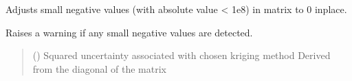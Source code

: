 \documentclass[letterpaper,10pt,english]{sphinxmanual}
\begin{document}

\begin{fulllineitems}
\label{\detokenize{misc:glomar_gridding.utils.adjust_small_negative}}
\pysigstartsignatures
\pysiglinewithargsret
{}
{}
{}
\pysigstopsignatures
\sphinxAtStartPar
Adjusts small negative values (with absolute value \textless{} 1e\sphinxhyphen{}8)
in matrix to 0 in\sphinxhyphen{}place.

\sphinxAtStartPar
Raises a warning if any small negative values are detected.
\begin{quote}\begin{description}
\sphinxAtStartPar
{} (\sphinxstyleliteralemphasis{\sphinxupquote{{[}}}\sphinxstyleliteralemphasis{\sphinxupquote{{]}}}) \textendash{} Squared uncertainty associated with chosen kriging method
Derived from the diagonal of the matrix

\sphinxAtStartPar
{}

\end{description}\end{quote}

\end{fulllineitems}

\end{document}
